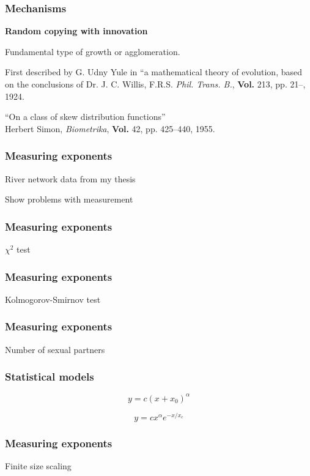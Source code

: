 \begin{frame}
  \frametitle{Mechanisms}

\textbf{Random copying with innovation}

Fundamental type of growth or agglomeration.

First described by G. Udny Yule in 
``a mathematical theory of evolution, based on the 
conclusions of Dr. J. C. Willis, F.R.S.
\textit{Phil. Trans. B.}, \textbf{Vol.} 213, pp. 21--, 1924.

``On a class of skew distribution functions''\\
Herbert Simon, \textit{Biometrika}, \textbf{Vol.} 42, pp. 425--440, 1955.

\end{frame}

\begin{frame}
  \frametitle{Measuring exponents}

River network data from my thesis

Show problems with measurement



\end{frame}

\begin{frame}
  \frametitle{Measuring exponents}

$\chi^2$ test

\end{frame}

\begin{frame}
  \frametitle{Measuring exponents}

Kolmogorov-Smirnov test


\end{frame}

\begin{frame}
  \frametitle{Measuring exponents}

Number of sexual partners


\end{frame}

\begin{frame}
  \frametitle{Statistical models}

$$y = c (x + x_0)^\alpha$$

$$y = c x^\alpha e^{-x/x_c}$$

\end{frame}

\begin{frame}
  \frametitle{Measuring exponents}

Finite size scaling

\end{frame}

